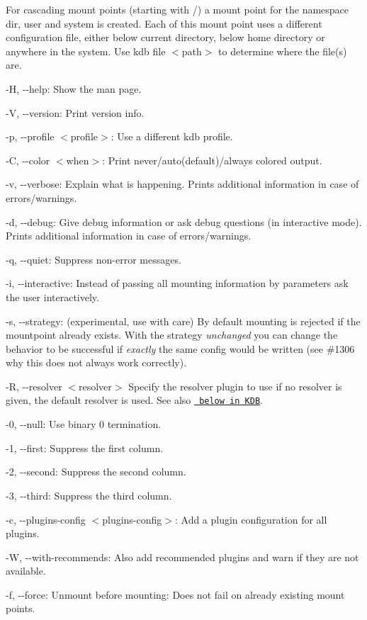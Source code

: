 For cascading mount points (starting with {\ttfamily /}) a mount point for the namespace {\ttfamily dir}, {\ttfamily user} and {\ttfamily system} is created. Each of this mount point uses a different configuration file, either below current directory, below home directory or anywhere in the system. Use {\ttfamily kdb file $<$path$>$} to determine where the file(s) are.


\begin{DoxyItemize}
\item {\ttfamily -\/H}, {\ttfamily -\/-\/help}\+: Show the man page.
\item {\ttfamily -\/V}, {\ttfamily -\/-\/version}\+: Print version info.
\item {\ttfamily -\/p}, {\ttfamily -\/-\/profile $<$profile$>$}\+: Use a different kdb profile.
\item {\ttfamily -\/C}, {\ttfamily -\/-\/color $<$when$>$}\+: Print never/auto(default)/always colored output.
\item {\ttfamily -\/v}, {\ttfamily -\/-\/verbose}\+: Explain what is happening. Prints additional information in case of errors/warnings.
\item {\ttfamily -\/d}, {\ttfamily -\/-\/debug}\+: Give debug information or ask debug questions (in interactive mode). Prints additional information in case of errors/warnings.
\item {\ttfamily -\/q}, {\ttfamily -\/-\/quiet}\+: Suppress non-\/error messages.
\item {\ttfamily -\/i}, {\ttfamily -\/-\/interactive}\+: Instead of passing all mounting information by parameters ask the user interactively.
\item {\ttfamily -\/s}, {\ttfamily -\/-\/strategy}\+: (experimental, use with care) By default mounting is rejected if the mountpoint already exists. With the strategy {\itshape unchanged} you can change the behavior to be successful if {\itshape exactly} the same config would be written (see \#1306 why this does not always work correctly).
\item {\ttfamily -\/R}, {\ttfamily -\/-\/resolver $<$resolver$>$} Specify the resolver plugin to use if no resolver is given, the default resolver is used. See also \href{\#KDB}{\texttt{ below in K\+DB}}.
\item {\ttfamily -\/0}, {\ttfamily -\/-\/null}\+: Use binary 0 termination.
\item {\ttfamily -\/1}, {\ttfamily -\/-\/first}\+: Suppress the first column.
\item {\ttfamily -\/2}, {\ttfamily -\/-\/second}\+: Suppress the second column.
\item {\ttfamily -\/3}, {\ttfamily -\/-\/third}\+: Suppress the third column.
\item {\ttfamily -\/c}, {\ttfamily -\/-\/plugins-\/config $<$plugins-\/config$>$}\+: Add a plugin configuration for all plugins.
\item {\ttfamily -\/W}, {\ttfamily -\/-\/with-\/recommends}\+: Also add recommended plugins and warn if they are not available.
\item {\ttfamily -\/f}, {\ttfamily -\/-\/force}\+: Unmount before mounting\+: Does not fail on already existing mount points.
\end{DoxyItemize}


